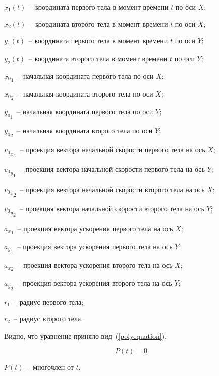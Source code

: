 \begin{Underequation}
  \(x_1(t)\)~-- координата первого тела в момент времени \(t\) по оси \(X\);

  \(x_2(t)\)~-- координата второго тела в момент времени \(t\) по оси \(X\);

  \(y_1(t)\)~-- координата первого тела в момент времени \(t\) по оси \(Y\);

  \(y_2(t)\)~-- координата второго тела в момент времени \(t\) по оси \(Y\);

  \({x_0}_1\)~-- начальная координата первого тела по оси \(X\);

  \({x_0}_2\)~-- начальная координата второго тела по оси \(X\);

  \({y_0}_1\)~-- начальная координата первого тела по оси \(Y\);

  \({y_0}_2\)~-- начальная координата второго тела по оси \(Y\);

  \({{v_0}_x}_1\)~-- проекция вектора начальной скорости первого тела на ось \(X\);

  \({{v_0}_y}_1\)~-- проекция вектора начальной скорости первого тела на ось \(Y\);

  \({{v_0}_x}_2\)~-- проекция вектора начальной скорости второго тела на ось \(X\);

  \({{v_0}_y}_2\)~-- проекция вектора начальной скорости второго тела на ось \(Y\);

  \({a_x}_1\)~-- проекция вектора ускорения первого тела на ось \(X\);

  \({a_y}_1\)~-- проекция вектора ускорения первого тела на ось \(Y\);

  \({a_x}_2\)~-- проекция вектора ускорения второго тела на ось \(X\);

  \({a_y}_2\)~-- проекция вектора ускорения второго тела на ось \(Y\);

  \(r_1\)~-- радиус первого тела;

  \(r_2\)~-- радиус второго тела.
\end{Underequation}

Видно, что уравнение приняло вид~(\ref{polyequation}).

\begin{equation}\label{polyequation}
  P(t) = 0
\end{equation}

\begin{Underequation}
  \(P(t)\)~-- многочлен от \(t\).
\end{Underequation}


